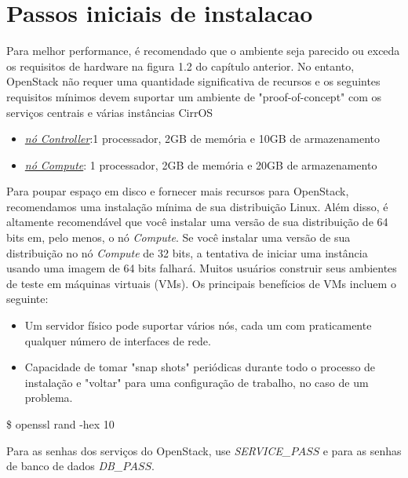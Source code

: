 \documentclass[a4paper]{book}
\begin{document}
	\section{Passos iniciais de instalacao}
	Para melhor performance, é recomendado que o ambiente seja parecido ou exceda os requisitos de hardware na figura 1.2  do capítulo anterior. No entanto, OpenStack não requer uma quantidade significativa de recursos e os seguintes requisitos mínimos devem suportar um ambiente de "proof-of-concept" com os serviços centrais e várias instâncias CirrOS
	\begin{itemize}
		\item \emph{\underline{nó Controller}}:1 processador, 2GB de memória e 10GB de armazenamento
		
		\item \emph{\underline{nó Compute}}: 1 processador, 2GB de memória e 20GB de armazenamento		
	\end{itemize}					
	
	Para poupar espaço em disco e fornecer mais recursos para OpenStack, recomendamos uma instalação mínima de sua distribuição Linux. Além disso, é altamente recomendável que você instalar uma versão de sua distribuição de 64 bits em, pelo menos, o nó \emph{Compute}. Se você instalar uma versão de sua distribuição no nó  \emph{Compute} de 32 bits, a tentativa de iniciar uma instância usando uma imagem de 64 bits falhará.
	Muitos usuários construir seus ambientes de teste em máquinas virtuais (VMs). Os principais benefícios de VMs incluem o seguinte:
	
	\begin{itemize}
		\item Um servidor físico pode suportar vários nós, cada um com praticamente qualquer número de interfaces de rede.
		
		\item Capacidade de tomar "snap shots" periódicas durante todo o processo de instalação e "voltar" para uma configuração de trabalho, no caso de um problema.
	\end{itemize}

	
	\begin{snugshade}
		\$ openssl rand -hex 10		
	\end{snugshade}
	
	Para as senhas dos serviços do OpenStack, use \emph{SERVICE\_$PASS$}	 e para as senhas de banco de dados \emph{DB\_$PASS$}.
\end{document}

